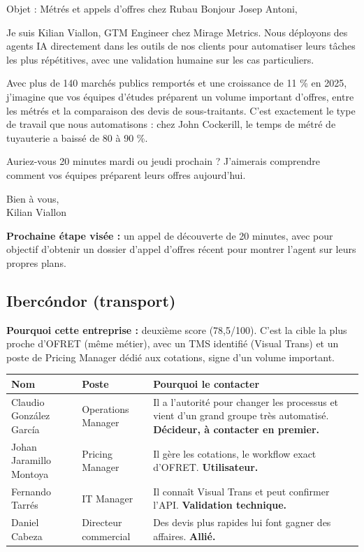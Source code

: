\documentclass[11pt,a4paper]{article}
\newcommand{\rubrique}[1]{\par\smallskip{\bfseries\color{accent}#1}\par}
\begin{document}
\begin{mailbox}{Objet : Métrés et appels d'offres chez Rubau}
Bonjour Josep Antoni,

Je suis Kilian Viallon, GTM Engineer chez Mirage Metrics. Nous déployons des agents IA directement dans les outils de nos clients pour automatiser leurs tâches les plus répétitives, avec une validation humaine sur les cas particuliers.

Avec plus de 140 marchés publics remportés et une croissance de 11 \% en 2025, j'imagine que vos équipes d'études préparent un volume important d'offres, entre les métrés et la comparaison des devis de sous-traitants. C'est exactement le type de travail que nous automatisons : chez John Cockerill, le temps de métré de tuyauterie a baissé de 80 à 90 \%.

Auriez-vous 20 minutes mardi ou jeudi prochain ? J'aimerais comprendre comment vos équipes préparent leurs offres aujourd'hui.

Bien à vous,\\
Kilian Viallon
\end{mailbox}

\textbf{Prochaine étape visée :} un appel de découverte de 20 minutes, avec pour objectif d'obtenir un dossier d'appel d'offres récent pour montrer l'agent sur leurs propres plans.

\subsection{Ibercóndor (transport)}

\textbf{Pourquoi cette entreprise :} deuxième score (78,5/100). C'est la cible la plus proche d'OFRET (même métier), avec un TMS identifié (Visual Trans) et un poste de Pricing Manager dédié aux cotations, signe d'un volume important.

\rubrique{Interlocuteurs}
\begin{center}
\small
\begin{tabularx}{\textwidth}{@{}l l X@{}}
\toprule
\textbf{Nom} & \textbf{Poste} & \textbf{Pourquoi le contacter} \\
\midrule
Claudio González García & Operations Manager & Il a l'autorité pour changer les processus et vient d'un grand groupe très automatisé. \textbf{Décideur, à contacter en premier.} \\
Johan Jaramillo Montoya & Pricing Manager & Il gère les cotations, le workflow exact d'OFRET. \textbf{Utilisateur.} \\
Fernando Tarrés & IT Manager & Il connaît Visual Trans et peut confirmer l'API. \textbf{Validation technique.} \\
Daniel Cabeza & Directeur commercial & Des devis plus rapides lui font gagner des affaires. \textbf{Allié.} \\
\bottomrule
\end{tabularx}
\end{center}
\end{document}
